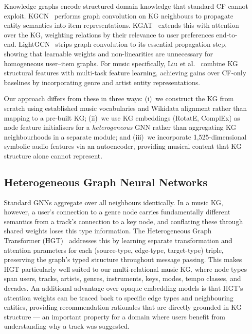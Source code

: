 Knowledge graphs encode structured domain knowledge that standard CF cannot exploit. KGCN~\cite{wang2019kgcn} performs graph convolution on KG neighbours to propagate entity semantics into item representations. KGAT~\cite{wang2019kgat} extends this with attention over the KG, weighting relations by their relevance to user preferences end-to-end. LightGCN~\cite{he2020lightgcn} strips graph convolution to its essential propagation step, showing that learnable weights and non-linearities are unnecessary for homogeneous user--item graphs. For music specifically, Liu et al.~\cite{liu2024kgmusic} combine KG structural features with multi-task feature learning, achieving gains over CF-only baselines by incorporating genre and artist entity representations.

Our approach differs from these in three ways: (i)~we construct the KG from scratch using established music vocabularies and Wikidata alignment rather than mapping to a pre-built KG; (ii)~we use KG embeddings (RotatE, ComplEx) as node feature initialisers for a \textit{heterogeneous} GNN rather than aggregating KG neighbourhoods in a separate module; and (iii)~we incorporate 1,525-dimensional symbolic audio features via an autoencoder, providing musical content that KG structure alone cannot represent.

\subsection{Heterogeneous Graph Neural Networks}

Standard GNNs aggregate over all neighbours identically. In a music KG, however, a user's connection to a genre node carries fundamentally different semantics from a track's connection to a key node, and conflating these through shared weights loses this type information. The Heterogeneous Graph Transformer (HGT)~\cite{hu2020hgt} addresses this by learning separate transformation and attention parameters for each (source-type, edge-type, target-type) triple, preserving the graph's typed structure throughout message passing. This makes HGT particularly well suited to our multi-relational music KG, where node types span users, tracks, artists, genres, instruments, keys, modes, tempo classes, and decades. An additional advantage over opaque embedding models is that HGT's attention weights can be traced back to specific edge types and neighbouring entities, providing recommendation rationales that are directly grounded in KG structure — an important property for a domain where users benefit from understanding why a track was suggested.

